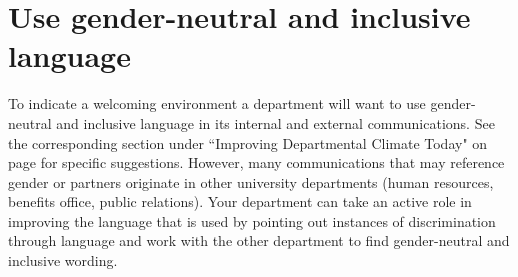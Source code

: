 \section {Use gender-neutral and inclusive language}
\label{univ-language}
To indicate a welcoming environment a department will want to use gender-neutral and inclusive language in its internal and external communications. See the corresponding section under ``Improving Departmental Climate Today" on page \pageref{gender-language} for specific suggestions. However, many communications that may reference gender or partners originate in other university departments (human resources, benefits office, public relations). Your department can take an active role in improving the language that is used by pointing out instances of discrimination through language and work with the other department to find gender-neutral and inclusive wording.


















